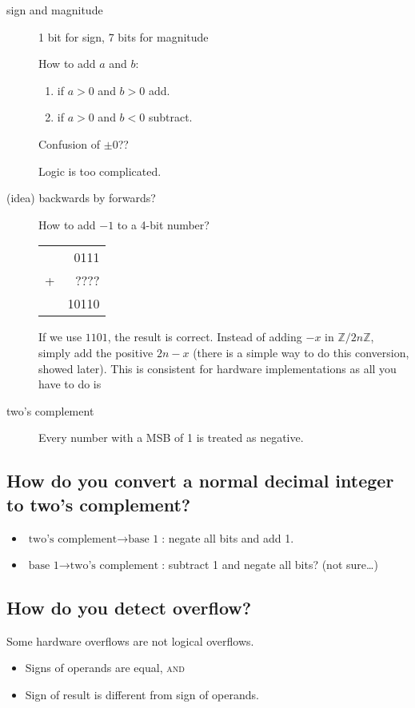 \begin{description}
	\item[sign and magnitude] 1 bit for sign, 7 bits for magnitude
	
	How to add \(a\) and \(b\):
	\begin{enumerate}
		\item if \(a > 0\) and \(b > 0\) add.
		\item if \(a > 0\) and \(b < 0\) subtract.
	\end{enumerate}
	Confusion of \(\pm 0\)??
	
	Logic is too complicated.
	\item[(idea) backwards by forwards?] How to add \(-1\) to a 4-bit number?
	
	\begin{tabular}{rr}
		& 0111 \\
		+ &???? \\ \hline
		&10110
	\end{tabular}
	
	If we use \(1101\), the result is correct. Instead of adding \(-x\) in \(\mathbb{Z}/2n\mathbb{Z}\), simply add the positive \(2n - x\) (there is a simple way to do this conversion, showed later). This is consistent for hardware implementations as all you have to do is
	
	\item[two's complement] Every number with a MSB of 1 is treated as negative.
\end{description}

\subsection{How do you convert a normal decimal integer to two's complement?}
\begin{itemize}
	\item \(\text{two's complement}\rightarrow\text{base 1}\): negate all bits and add 1.
	\item \(\text{base 1}\rightarrow\text{two's complement}\): subtract 1 and negate all bits? (not sure\ldots)
\end{itemize}

\subsection{How do you detect overflow?}
Some hardware overflows are not logical overflows.
\begin{itemize}
	\item Signs of operands are equal, \textsc{and}
	\item Sign of result is different from sign of operands.
\end{itemize}

